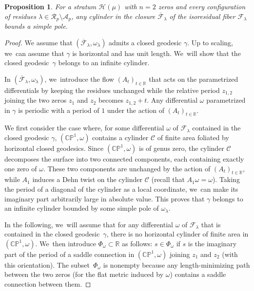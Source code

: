 \documentclass[11pt]{article}
\newtheorem{prop}[thm]{Proposition}
\theoremstyle{definition}
\begin{document}
\begin{prop}\label{prop:cylinder}
For a stratum $\mathcal{H}(\mu)$ with $n=2$ zeros and every configuration of residues $\lambda \in \mathcal{R}_{p} \setminus \mathcal{A}_{p}$, any cylinder in the closure $\overline{\mathcal{F}}_{\lambda}$ of the isoresidual fiber $\mathcal{F}_{\lambda}$ bounds a simple pole.
\end{prop}

\begin{proof}
We assume that $(\overline{\mathcal{F}}_{\lambda},\omega_{\lambda})$ admits a closed geodesic $\gamma$. Up to scaling, we~can assume that $\gamma$ is horizontal and has unit length. We~will show that the closed geodesic~$\gamma$ belongs to an infinite cylinder.

In $(\overline{\mathcal{F}}_{\lambda},\omega_{\lambda})$, we~introduce the flow $(A_{t})_{t \in \mathbb{R}}$ that acts on the parametrized differentials by keeping the residues unchanged while the relative period $z_{1,2}$ joining the two zeros $z_1$ and $z_2$ becomes $z_{1,2}+t$. Any differential $\omega$ parametrized in $\gamma$ is periodic with a period of $1$ under the action of $(A_{t})_{t \in \mathbb{R}}$.

We first consider the case where, for some differential $\omega$ of $\mathcal{F}_{\lambda}$ contained in the closed geodesic $\gamma$, $(\mathbb{CP}^{1},\omega)$ contains a cylinder $\mathcal{C}$ of finite area foliated by horizontal closed geodesics. Since $(\mathbb{CP}^{1},\omega)$ is of genus zero, the cylinder $\mathcal{C}$ decomposes the surface into two connected components, each containing exactly one zero of $\omega$. These two components are unchanged by the action of $(A_{t})_{t \in \mathbb{R}}$, while $A_{1}$ induces a Dehn twist on the cylinder $\mathcal{C}$ (recall that $A_{1}\omega=\omega$). Taking the period of a diagonal of the cylinder as a local coordinate, we~can make its imaginary part arbitrarily large in absolute value. This proves that $\gamma$ belongs to an infinite cylinder bounded by some simple pole of $\omega_{\lambda}$.

In the following, we~will assume that for any differential $\omega$ of $\mathcal{F}_{\lambda}$ that is contained in the closed geodesic~$\gamma$, there is no horizontal cylinder of finite area in $(\mathbb{CP}^{1},\omega)$. We~then introduce $\Phi_{\omega} \subset \mathbb{R}$ as follows: $s \in \Phi_{\omega}$ if $s$ is the imaginary part of the period of a saddle connection in $(\mathbb{CP}^{1},\omega)$ joining $z_1$ and $z_2$ (with this orientation). The subset~$\Phi_{\omega}$ is nonempty because any length-minimizing path between the two zeros (for the flat metric induced by $\omega$) contains a saddle connection between them.


\end{proof}
\end{document}
